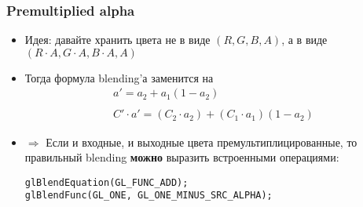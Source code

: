 \documentclass[10pt]{beamer}
\begin{document}
\begin{frame}[fragile]
\frametitle{Premultiplied alpha}
\begin{itemize}
\item Идея: давайте хранить цвета не в виде \begin{math}(R,G,B,A)\end{math}, а в виде \begin{math}(R\cdot A, G\cdot A, B\cdot A, A)\end{math}
\pause
\item Тогда формула blending'а заменится на
\begin{equation*}
\begin{matrix}
a' = a_2+a_1(1-a_2) \\
\\
C'\cdot a' = (C_2\cdot a_2)+(C_1\cdot a_1)(1-a_2)
\end{matrix}
\end{equation*}
\pause
\item \begin{math}\Longrightarrow\end{math} Если и входные, и выходные цвета премультиплицированные, то правильный blending \textbf{можно} выразить встроенными операциями: 
\begin{verbatim}
glBlendEquation(GL_FUNC_ADD);
glBlendFunc(GL_ONE, GL_ONE_MINUS_SRC_ALPHA);
\end{verbatim}
\end{itemize}
\end{frame}
\end{document}
